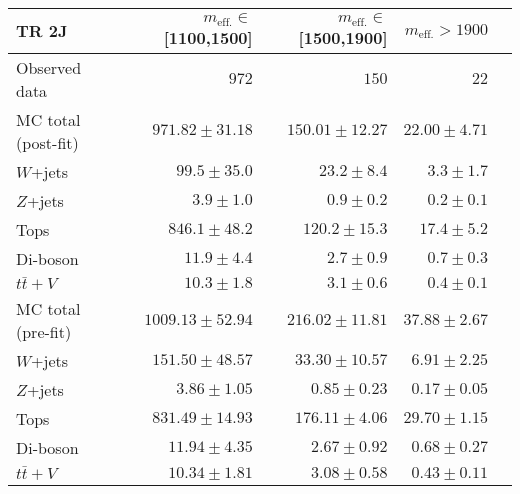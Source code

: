 \begin{table}
\begin{center}
\begin{tabular*}{\textwidth}{@{\extracolsep{\fill}}lrrrr}
  \toprule
  \textbf{TR 2J} & $m_{\mathrm{eff.}}\in$[1100,1500] & $m_{\mathrm{eff.}}\in$[1500,1900] & $m_{\mathrm{eff.}}>1900$ \\
\midrule

Observed data          & $972$              & $150$              & $22$                    \\
\midrule
\midrule
MC total (post-fit)         & $971.82 \pm 31.18$          & $150.01 \pm 12.27$          & $22.00 \pm 4.71$              \\
\midrule
        $W$+jets         & $99.5 \pm 35.0$          & $23.2 \pm 8.4$          & $3.3 \pm 1.7$              \\
        $Z$+jets         & $3.9 \pm 1.0$          & $0.9 \pm 0.2$          & $0.2 \pm 0.1$              \\
        Tops         & $846.1 \pm 48.2$          & $120.2 \pm 15.3$          & $17.4 \pm 5.2$              \\
        Di-boson         & $11.9 \pm 4.4$          & $2.7 \pm 0.9$          & $0.7 \pm 0.3$              \\
        $t\bar{t}+V$         & $10.3 \pm 1.8$          & $3.1 \pm 0.6$          & $0.4 \pm 0.1$              \\
\midrule
\midrule
MC total (pre-fit)              & $1009.13 \pm 52.94$          & $216.02 \pm 11.81$          & $37.88 \pm 2.67$              \\
\midrule
        $W$+jets         & $151.50 \pm 48.57$          & $33.30 \pm 10.57$          & $6.91 \pm 2.25$              \\
        $Z$+jets         & $3.86 \pm 1.05$          & $0.85 \pm 0.23$          & $0.17 \pm 0.05$              \\
        Tops         & $831.49 \pm 14.93$          & $176.11 \pm 4.06$          & $29.70 \pm 1.15$              \\
        Di-boson         & $11.94 \pm 4.35$          & $2.67 \pm 0.92$          & $0.68 \pm 0.27$              \\
        $t\bar{t}+V$         & $10.34 \pm 1.81$          & $3.08 \pm 0.58$          & $0.43 \pm 0.11$              \\
    \bottomrule
    \end{tabular*}
    
  \end{center}
\end{table}


